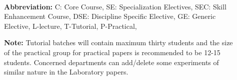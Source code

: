 {\footnotesize  \begin{description}
		\item[]~\\	
		\textbf{Abbreviation:} C: Core Course, SE: Specialization Electives, SEC: Skill Enhancement Course, DSE: Discipline Specific Elective, GE: Generic Elective, L-lecture, T-Tutorial, P-Practical, 
		
		\textbf{Note:} Tutorial batches will contain maximum thirty students and the size of the practical group for practical papers is recommended to be 12-15 students. Concerned departments can add/delete some experiments of similar nature in the Laboratory papers. 
\end{description}}




                

